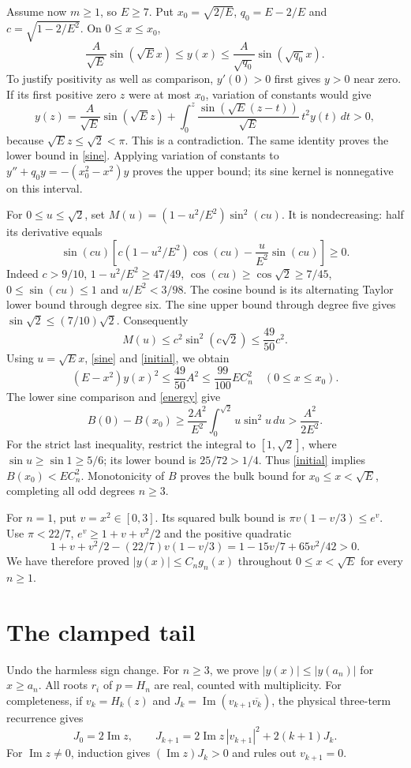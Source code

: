 \documentclass[11pt]{article}
\begin{document}
Assume now $m\geq1$, so $E\geq7$. Put $x_0=\sqrt{2/E}$, $q_0=E-2/E$ and $c=\sqrt{1-2/E^2}$. On $0\leq x\leq x_0$,
\begin{equation}\label{sine}
 \frac A{\sqrt E}\sin(\sqrt E x)\leq y(x)\leq
 \frac A{\sqrt{q_0}}\sin(\sqrt{q_0}x).
\end{equation}
To justify positivity as well as comparison, $y'(0)>0$ first gives $y>0$ near zero. If its first positive zero $z$ were at most $x_0$, variation of constants would give
\[
 y(z)=\frac A{\sqrt E}\sin(\sqrt E z)+
 \int_0^z\frac{\sin(\sqrt E(z-t))}{\sqrt E}\,t^2y(t)\,dt>0,
\]
because $\sqrt E z\leq\sqrt2<\pi$. This is a contradiction. The same identity proves the lower bound in \eqref{sine}. Applying variation of constants to $y''+q_0y=-(x_0^2-x^2)y$ proves the upper bound; its sine kernel is nonnegative on this interval.

For $0\leq u\leq\sqrt2$, set $M(u)=(1-u^2/E^2)\sin^2(cu)$. It is nondecreasing: half its derivative equals
\[
 \sin(cu)\left[c(1-u^2/E^2)\cos(cu)-\frac u{E^2}\sin(cu)\right]\geq0.
\]
Indeed $c>9/10$, $1-u^2/E^2\geq47/49$, $\cos(cu)\geq\cos\sqrt2\geq7/45$, $0\leq\sin(cu)\leq1$ and $u/E^2<3/98$. The cosine bound is its alternating Taylor lower bound through degree six. The sine upper bound through degree five gives $\sin\sqrt2\leq(7/10)\sqrt2$. Consequently
\[
 M(u)\leq c^2\sin^2(c\sqrt2)\leq\frac{49}{50}c^2.
\]
Using $u=\sqrt E x$, \eqref{sine} and \eqref{initial}, we obtain
\begin{equation}\label{small}
 (E-x^2)y(x)^2\leq\frac{49}{50}A^2\leq\frac{99}{100}EC_n^2
 \quad(0\leq x\leq x_0).
\end{equation}
The lower sine comparison and \eqref{energy} give
\[
 B(0)-B(x_0)\geq\frac{2A^2}{E^2}\int_0^{\sqrt2}u\sin^2u\,du
 >\frac{A^2}{2E^2}.
\]
For the strict last inequality, restrict the integral to $[1,\sqrt2]$, where $\sin u\geq\sin1\geq5/6$; its lower bound is $25/72>1/4$. Thus \eqref{initial} implies $B(x_0)<EC_n^2$. Monotonicity of $B$ proves the bulk bound for $x_0\leq x<\sqrt E$, completing all odd degrees $n\geq3$.

For $n=1$, put $v=x^2\in[0,3]$. Its squared bulk bound is
$\pi v(1-v/3)\leq e^v$. Use $\pi<22/7$, $e^v\geq1+v+v^2/2$ and the positive quadratic
\[
 1+v+v^2/2-(22/7)v(1-v/3)=1-15v/7+65v^2/42>0.
\]
We have therefore proved $|y(x)|\leq C_ng_n(x)$ throughout $0\leq x<\sqrt E$ for every $n\geq1$.

\section*{The clamped tail}
Undo the harmless sign change. For $n\geq3$, we prove $|y(x)|\leq|y(a_n)|$ for $x\geq a_n$. All roots $r_i$ of $p=H_n$ are real, counted with multiplicity. For completeness, if $v_k=H_k(z)$ and $J_k=\operatorname{Im}(v_{k+1}\overline{v_k})$, the physical three-term recurrence gives
\[
 J_0=2\operatorname{Im}z,\qquad
 J_{k+1}=2\operatorname{Im}z\,|v_{k+1}|^2+2(k+1)J_k.
\]
For $\operatorname{Im}z\ne0$, induction gives $(\operatorname{Im}z)J_k>0$ and rules out $v_{k+1}=0$.
\end{document}
